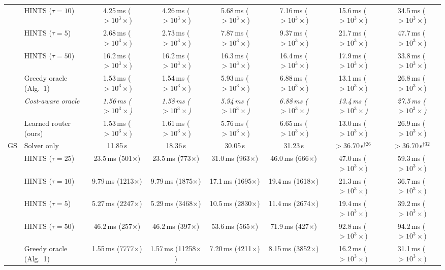 {\begin{tabular}{llcccccc}
 & HINTS ($\tau{=}10$) & 4.25\,ms ($>10^{3}\times$) & 4.26\,ms ($>10^{3}\times$) & 5.68\,ms ($>10^{3}\times$) & 7.16\,ms ($>10^{3}\times$) & 15.6\,ms ($>10^{3}\times$) & 34.5\,ms ($>10^{3}\times$) \\
 & HINTS ($\tau{=}5$) & 2.68\,ms ($>10^{3}\times$) & 2.73\,ms ($>10^{3}\times$) & 7.87\,ms ($>10^{3}\times$) & 9.37\,ms ($>10^{3}\times$) & 21.7\,ms ($>10^{3}\times$) & 47.7\,ms ($>10^{3}\times$) \\
 & HINTS ($\tau{=}50$) & 16.2\,ms ($>10^{3}\times$) & 16.2\,ms ($>10^{3}\times$) & 16.3\,ms ($>10^{3}\times$) & 16.4\,ms ($>10^{3}\times$) & 17.9\,ms ($>10^{3}\times$) & 33.8\,ms ($>10^{3}\times$) \\
 & Greedy oracle (Alg.~1) & 1.53\,ms ($>10^{3}\times$) & 1.54\,ms ($>10^{3}\times$) & 5.93\,ms ($>10^{3}\times$) & 6.88\,ms ($>10^{3}\times$) & 13.1\,ms ($>10^{3}\times$) & 26.8\,ms ($>10^{3}\times$) \\
 & \textit{Cost-aware oracle} & \textit{1.56\,ms ($>10^{3}\times$)} & \textit{1.58\,ms ($>10^{3}\times$)} & \textit{5.94\,ms ($>10^{3}\times$)} & \textit{6.88\,ms ($>10^{3}\times$)} & \textit{13.4\,ms ($>10^{3}\times$)} & \textit{27.5\,ms ($>10^{3}\times$)} \\
 & Learned router (ours) & 1.53\,ms ($>10^{3}\times$) & 1.61\,ms ($>10^{3}\times$) & 5.76\,ms ($>10^{3}\times$) & 6.65\,ms ($>10^{3}\times$) & 13.0\,ms ($>10^{3}\times$) & 26.9\,ms ($>10^{3}\times$) \\
\midrule
GS & Solver only & 11.85\,s & 18.36\,s & 30.05\,s & 31.23\,s & $>$36.70\,s$^{\dagger 26}$ & $>$36.70\,s$^{\dagger 32}$ \\
 & HINTS ($\tau{=}25$) & 23.5\,ms (501$\times$) & 23.5\,ms (773$\times$) & 31.0\,ms (963$\times$) & 46.0\,ms (666$\times$) & 47.0\,ms ($>10^{3}\times$) & 59.3\,ms ($>10^{3}\times$) \\
 & HINTS ($\tau{=}10$) & 9.79\,ms (1213$\times$) & 9.79\,ms (1875$\times$) & 17.1\,ms (1695$\times$) & 19.4\,ms (1618$\times$) & 21.3\,ms ($>10^{3}\times$) & 36.7\,ms ($>10^{3}\times$) \\
 & HINTS ($\tau{=}5$) & 5.27\,ms (2247$\times$) & 5.29\,ms (3468$\times$) & 10.5\,ms (2830$\times$) & 11.4\,ms (2674$\times$) & 19.4\,ms ($>10^{3}\times$) & 39.2\,ms ($>10^{3}\times$) \\
 & HINTS ($\tau{=}50$) & 46.2\,ms (257$\times$) & 46.2\,ms (397$\times$) & 53.6\,ms (565$\times$) & 71.9\,ms (427$\times$) & 92.8\,ms ($>10^{3}\times$) & 94.2\,ms ($>10^{3}\times$) \\
 & Greedy oracle (Alg.~1) & 1.55\,ms (7777$\times$) & 1.57\,ms (11258$\times$) & 7.20\,ms (4211$\times$) & 8.15\,ms (3852$\times$) & 16.2\,ms ($>10^{3}\times$) & 31.1\,ms ($>10^{3}\times$) \\

\end{tabular}}
